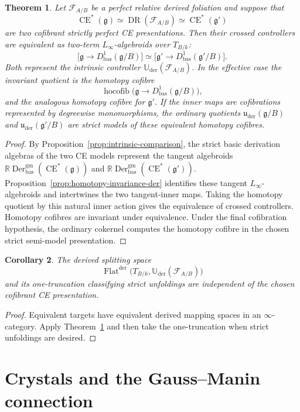 \documentclass[11pt,reqno,a4paper,dvipsnames,x11names]{amsart}
\numberwithin{equation}{section}
\theoremstyle{plain}
\newtheorem{theorem}{Theorem}[section]
\newtheorem{corollary}[theorem]{Corollary}
\theoremstyle{definition}
\theoremstyle{remark}
\DeclareMathOperator{\Der}{Der}
\DeclareMathOperator{\hocofib}{hocofib}
\DeclareMathOperator{\CE}{CE}
\DeclareMathOperator{\DR}{DR}
\newcommand{\kk}{k}
\newcommand{\cF}{\mathcal F}
\newcommand{\g}{\mathfrak g}
\newcommand{\uuder}{\mathfrak u_{\mathrm{der}}}
\newcommand{\Uder}{\mathbb U_{\mathrm{der}}}
\newcommand{\bas}{\mathrm{bas}}
\begin{document}
\begin{theorem}\label{thm:presentation-independence}
Let \(\cF_{A/B}\) be a perfect relative derived foliation and suppose that
\[
 \CE^*(\g)\simeq\DR(\cF_{A/B})\simeq\CE^*(\g')
\]
are two cofibrant strictly perfect CE presentations. Then their crossed controllers are equivalent as two-term \(L_\infty\)-algebroids over \(T_{B/\kk}\):
\[
 \bigl[\g\to D^1_{\bas}(\g/B)\bigr]
 \simeq
 \bigl[\g'\to D^1_{\bas}(\g'/B)\bigr].
\]
Both represent the intrinsic controller \(\Uder(\cF_{A/B})\). In the effective case the invariant quotient is the homotopy cofibre
\[
 \hocofib\bigl(\g\to D^1_{\bas}(\g/B)\bigr),
\]
and the analogous homotopy cofibre for \(\g'\). If the inner maps are cofibrations represented by degreewise monomorphisms, the ordinary quotients \(\uuder(\g/B)\) and \(\uuder(\g'/B)\) are strict models of these equivalent homotopy cofibres.
\end{theorem}

\begin{proof}
By Proposition~\ref{prop:intrinsic-comparison}, the strict basic derivation algebras of the two CE models represent the tangent algebroids
\(\mathbb R\Der^{\mathrm{gm}}_{\bas}(\CE^*(\g))\) and
\(\mathbb R\Der^{\mathrm{gm}}_{\bas}(\CE^*(\g'))\). Proposition~\ref{prop:homotopy-invariance-der} identifies these tangent \(L_\infty\)-algebroids and intertwines the two tangent-inner maps. Taking the homotopy quotient by this natural inner action gives the equivalence of crossed controllers. Homotopy cofibres are invariant under equivalence. Under the final cofibration hypothesis, the ordinary cokernel computes the homotopy cofibre in the chosen strict semi-model presentation.
\end{proof}

\begin{corollary}\label{cor:classification-invariance}
The derived splitting space
\[
 \operatorname{Flat}^{\mathrm{der}}
 \bigl(T_{B/\kk},\Uder(\cF_{A/B})\bigr)
\]
and its one-truncation classifying strict unfoldings are independent of the chosen cofibrant CE presentation.
\end{corollary}

\begin{proof}
Equivalent targets have equivalent derived mapping spaces in an \(\infty\)-category. Apply Theorem~\ref{thm:presentation-independence} and then take the one-truncation when strict unfoldings are desired.
\end{proof}


\section{Crystals and the Gauss--Manin connection}\label{sec:crystals}
\end{document}
